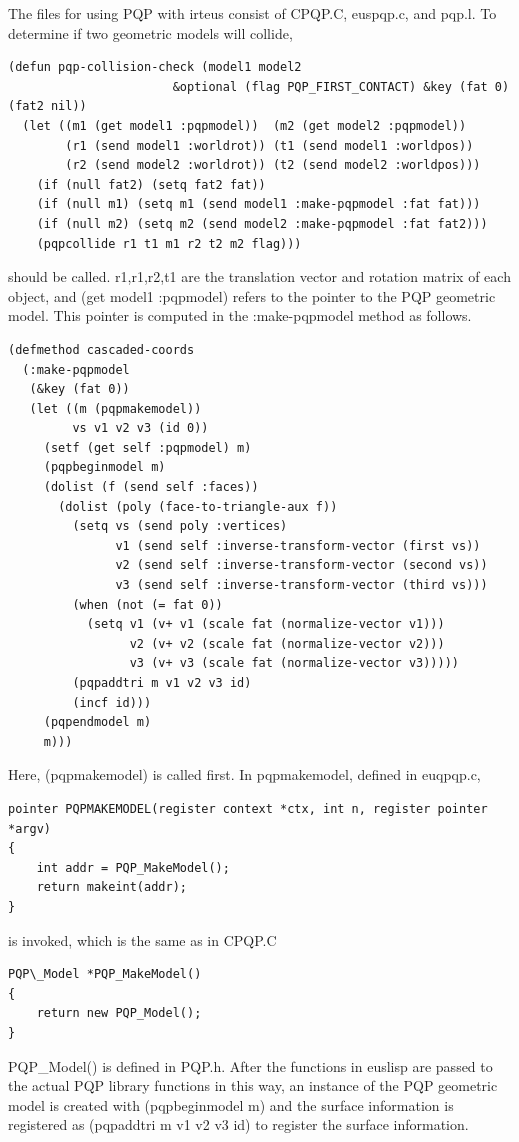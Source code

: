 The files for using PQP with irteus consist of CPQP.C, euspqp.c, and pqp.l.
To determine if two geometric models will collide,
{\baselineskip=10pt
\begin{verbatim}
(defun pqp-collision-check (model1 model2
				       &optional (flag PQP_FIRST_CONTACT) &key (fat 0) (fat2 nil))
  (let ((m1 (get model1 :pqpmodel))  (m2 (get model2 :pqpmodel))
        (r1 (send model1 :worldrot)) (t1 (send model1 :worldpos))
        (r2 (send model2 :worldrot)) (t2 (send model2 :worldpos)))
    (if (null fat2) (setq fat2 fat))
    (if (null m1) (setq m1 (send model1 :make-pqpmodel :fat fat)))
    (if (null m2) (setq m2 (send model2 :make-pqpmodel :fat fat2)))
    (pqpcollide r1 t1 m1 r2 t2 m2 flag)))
\end{verbatim}
}
should be called. 
r1,r1,r2,t1 are the translation vector and rotation matrix of each object, and (get model1 :pqpmodel) refers to the pointer to the PQP geometric model. This pointer is computed in the :make-pqpmodel method as follows.
{\baselineskip=10pt
\begin{verbatim}
(defmethod cascaded-coords
  (:make-pqpmodel
   (&key (fat 0))
   (let ((m (pqpmakemodel))
         vs v1 v2 v3 (id 0))
     (setf (get self :pqpmodel) m)
     (pqpbeginmodel m)
     (dolist (f (send self :faces))
       (dolist (poly (face-to-triangle-aux f))
         (setq vs (send poly :vertices)
               v1 (send self :inverse-transform-vector (first vs))
               v2 (send self :inverse-transform-vector (second vs))
               v3 (send self :inverse-transform-vector (third vs)))
         (when (not (= fat 0))
           (setq v1 (v+ v1 (scale fat (normalize-vector v1)))
                 v2 (v+ v2 (scale fat (normalize-vector v2)))
                 v3 (v+ v3 (scale fat (normalize-vector v3)))))
         (pqpaddtri m v1 v2 v3 id)
         (incf id)))
     (pqpendmodel m)
     m)))
\end{verbatim}
}
Here, (pqpmakemodel) is called first.
In pqpmakemodel, defined in euqpqp.c,

{\baselineskip=10pt
\begin{verbatim}
pointer PQPMAKEMODEL(register context *ctx, int n, register pointer *argv)
{
    int addr = PQP_MakeModel();
    return makeint(addr);
}
\end{verbatim}
}

is invoked, which is the same as in CPQP.C
{\baselineskip=10pt
\begin{verbatim}
PQP\_Model *PQP_MakeModel()
{
    return new PQP_Model();
}
\end{verbatim}
}
PQP\_Model() is defined in PQP.h. After the functions in euslisp are passed to the actual PQP library functions in this way, an instance of the PQP geometric model is created with (pqpbeginmodel m) and the surface information is registered as (pqpaddtri m v1 v2 v3 id) to register the surface information.

